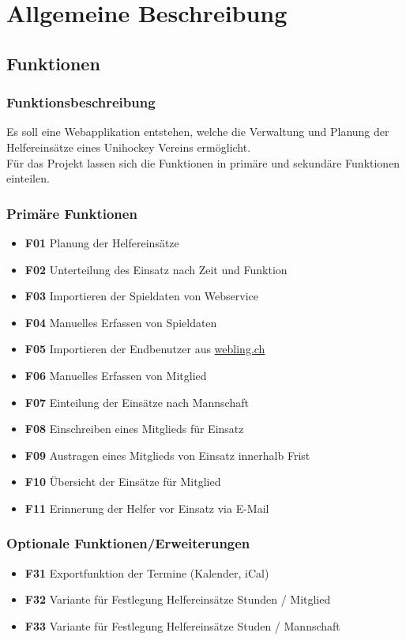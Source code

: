 \chapter{Allgemeine Beschreibung}
    
    \section{Funktionen}
    \subsection{Funktionsbeschreibung}
    Es soll eine Webapplikation entstehen, welche die Verwaltung und Planung der Helfereinsätze eines Unihockey Vereins ermöglicht.
    \\Für das Projekt lassen sich die Funktionen in primäre und sekundäre Funktionen einteilen.    
    
    \subsection{Primäre Funktionen}
    \begin{itemize}
        \item \textbf{F01} Planung der Helfereinsätze
        \item \textbf{F02} Unterteilung des Einsatz nach Zeit und Funktion
        \item \textbf{F03} Importieren der Spieldaten von Webservice
        \item \textbf{F04} Manuelles Erfassen von Spieldaten
        \item \textbf{F05} Importieren der Endbenutzer aus \href{http://www.webling.ch}{webling.ch}
        \item \textbf{F06} Manuelles Erfassen von Mitglied
        \item \textbf{F07} Einteilung der Einsätze nach Mannschaft
        \item \textbf{F08} Einschreiben eines Mitglieds für Einsatz
        \item \textbf{F09} Austragen eines Mitglieds von Einsatz innerhalb Frist
        \item \textbf{F10} Übersicht der Einsätze für Mitglied
        \item \textbf{F11} Erinnerung der Helfer vor Einsatz via E-Mail
    \end{itemize}
    
    \subsection{Optionale Funktionen/Erweiterungen}
    \begin{itemize}
        \item \textbf{F31} Exportfunktion der Termine (Kalender, iCal)
        \item \textbf{F32} Variante für Festlegung Helfereinsätze Stunden / Mitglied
        \item \textbf{F33} Variante für Festlegung Helfereinsätze Studen  / Mannschaft
    \end{itemize}
    
